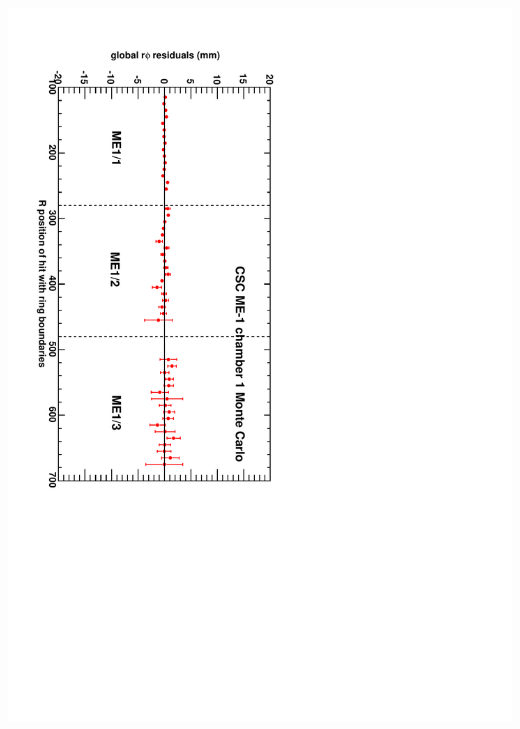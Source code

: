 \documentclass[compress]{beamer}
\begin{document}
\begin{frame}
\begin{columns}
\vspace{-0.2 cm}
\includegraphics[height=\linewidth, angle=90]{CSCrphires_vsR_MEm1ch01_MC.pdf}

\end{columns}
\end{frame}








\end{document}
